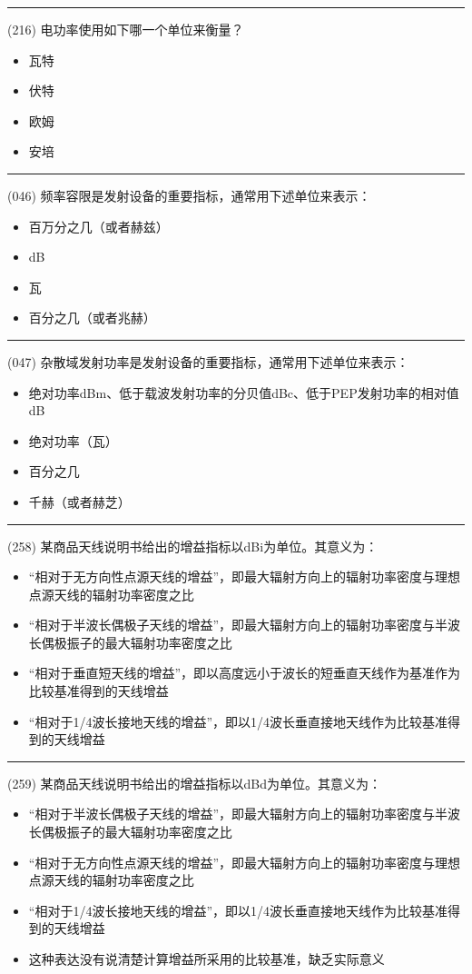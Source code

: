 \documentclass[twocolumn,hyperref,UTF8]{ctexart}  %
\begin{document}
\noindent\rule{0.5\textwidth}{1pt}
\heiti (216) 电功率使用如下哪一个单位来衡量？ \songti {\color{gray} [LK1135] }
\begin{itemize}
	\item  瓦特
	\item  伏特
	\item  欧姆
	\item  安培
\end{itemize}


\noindent\rule{0.5\textwidth}{1pt}
\heiti (046) 频率容限是发射设备的重要指标，通常用下述单位来表示： \songti {\color{gray} [LK0117] }
\begin{itemize}
	\item  百万分之几（或者赫兹）
	\item  dB
	\item  瓦
	\item  百分之几（或者兆赫）
\end{itemize}


\noindent\rule{0.5\textwidth}{1pt}
\heiti (047) 杂散域发射功率是发射设备的重要指标，通常用下述单位来表示： \songti {\color{gray} [LK0118] }
\begin{itemize}
	\item  绝对功率dBm、低于载波发射功率的分贝值dBc、低于PEP发射功率的相对值dB
	\item  绝对功率（瓦）
	\item  百分之几
	\item  千赫（或者赫芝）
\end{itemize}


\noindent\rule{0.5\textwidth}{1pt}
\heiti (258) 某商品天线说明书给出的增益指标以dBi为单位。其意义为： \songti {\color{gray} [LK0929] }
\begin{itemize}
	\item  “相对于{\color{LimeGreen}无方向性点源天线}的增益”，即最大辐射方向上的辐射功率密度与{\color{LimeGreen}理想点源天线}的辐射功率密度之比
	\item  “相对于半波长偶极子天线的增益”，即最大辐射方向上的辐射功率密度与半波长偶极振子的最大辐射功率密度之比
	\item  “相对于垂直短天线的增益”，即以高度远小于波长的短垂直天线作为基准作为比较基准得到的天线增益
	\item  “相对于1/4波长接地天线的增益”，即以1/4波长垂直接地天线作为比较基准得到的天线增益
\end{itemize}


\noindent\rule{0.5\textwidth}{1pt}
\heiti (259) 某商品天线说明书给出的增益指标以dBd为单位。其意义为： \songti {\color{gray} [LK0930] }
\begin{itemize}
	\item  “相对于{\color{LimeGreen}半波长偶极子天线}的增益”，即最大辐射方向上的辐射功率密度与{\color{LimeGreen}半波长偶极振子}的最大辐射功率密度之比
	\item  “相对于无方向性点源天线的增益”，即最大辐射方向上的辐射功率密度与理想点源天线的辐射功率密度之比
	\item  “相对于1/4波长接地天线的增益”，即以1/4波长垂直接地天线作为比较基准得到的天线增益
	\item  这种表达没有说清楚计算增益所采用的比较基准，缺乏实际意义
\end{itemize}
\end{document}
